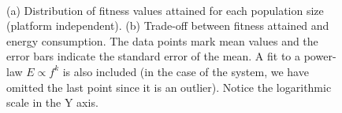 \begin{figure}[!t]
~~
\caption{(a) Distribution of fitness values attained for each population size (platform independent). 
(b) Trade-off between fitness attained and energy consumption. The
data points mark mean values and the error bars indicate the standard
error of the mean. A fit to a power-law $E\propto f^k$ is also
included (in the case of the \blade system, we have omitted the last
point since it is an outlier).%
 Notice the logarithmic scale in the Y
axis. 
\label{fig:fitnessenergy}}
\end{figure}



